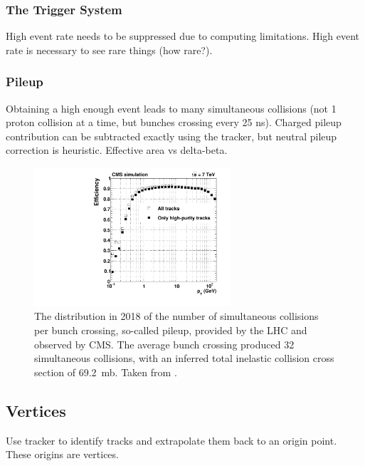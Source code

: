     \subsubsection{The Trigger System} \label{sec:trigger}

    High event rate needs to be suppressed due to computing limitations.
    High event rate is necessary to see rare things (how rare?).

    \subsubsection{Pileup} \label{sec:pileup}

    Obtaining a high enough event leads to many simultaneous collisions (not 1 proton collision at a time, but bunches crossing every 25 ns).
    Charged pileup contribution can be subtracted exactly using the tracker, but neutral pileup correction is heuristic.
    Effective area vs delta-beta.

    \begin{figure}[h!]
      \centering
      \includegraphics[width=0.65\textwidth]{figures/efficiencyVsPt.pdf}
      \caption[Pileup distribution in 2018.]{
        The distribution in 2018 of the number of simultaneous collisions per bunch crossing, so-called pileup, provided by the LHC and observed by CMS.
        The average bunch crossing produced 32 simultaneous collisions, with an inferred total inelastic collision cross section of 69.2~mb.
        Taken from \cite{lumipublic}.}
      \label{fig:pileup}
    \end{figure}  

  \subsection{Vertices} \label{sec:vertices}

  Use tracker to identify tracks and extrapolate them back to an origin point.
  These origins are vertices.

